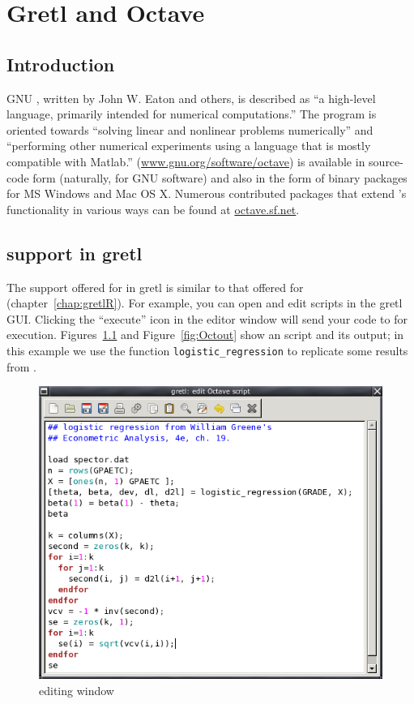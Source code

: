 \chapter{Gretl and Octave}
\label{chap:gretlOctave}

\section{Introduction}
\label{Octave-intro}

GNU , written by John W. Eaton and others, is described as
``a high-level language, primarily intended for numerical
computations.''  The program is oriented towards ``solving linear and
nonlinear problems numerically'' and ``performing other numerical
experiments using a language that is mostly compatible with Matlab.''
(\url{www.gnu.org/software/octave})  is available in
source-code form (naturally, for GNU software) and also in the form of
binary packages for MS Windows and Mac OS X.  Numerous contributed
packages that extend 's functionality in various ways can
be found at \url{octave.sf.net}.


\section{ support in gretl}
\label{sec:Octave-support}

The support offered for  in gretl is similar to that
offered for  (chapter~\ref{chap:gretlR}).  For example, you can
open and edit  scripts in the gretl GUI.  Clicking
the ``execute'' icon in the editor window will send your code to
 for execution.  Figures~\ref{fig:Octedit} and
Figure~\ref{fig:Octout} show an  script and its output; in
this example we use the function \verb|logistic_regression| to
replicate some results from \cite{greene00}.

\begin{figure}[htbp]
  \centering
  \includegraphics[scale=0.7]{figures/Octedit}
  \caption{ editing window}
  \label{fig:Octedit}
\end{figure}

